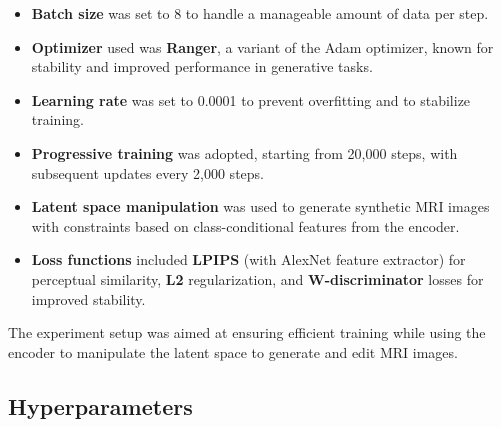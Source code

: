 \begin{itemize}
    \item \textbf{Batch size} was set to 8 to handle a manageable amount of data per step.
    \item \textbf{Optimizer} used was \textbf{Ranger}, a variant of the Adam optimizer, known for stability and improved performance in generative tasks.
    \item \textbf{Learning rate} was set to 0.0001 to prevent overfitting and to stabilize training.
    \item \textbf{Progressive training} was adopted, starting from 20,000 steps, with subsequent updates every 2,000 steps.
    \item \textbf{Latent space manipulation} was used to generate synthetic MRI images with constraints based on class-conditional features from the encoder.
    \item \textbf{Loss functions} included \textbf{LPIPS} (with AlexNet feature extractor) for perceptual similarity, \textbf{L2} regularization, and \textbf{W-discriminator} losses for improved stability.
\end{itemize}

The experiment setup was aimed at ensuring efficient training while using the encoder to manipulate the latent space to generate and edit MRI images.

\subsection{Hyperparameters}

